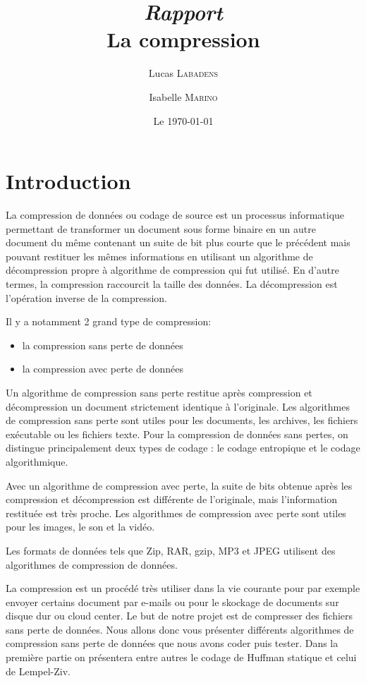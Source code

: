 \documentclass{report}
\title{\textit{Rapport} \\ La compression}
\author{Lucas \textsc{Labadens} \and Isabelle \textsc{Marino} }
\date{Le \today}
\begin{document}
\maketitle
 

\section*{Introduction}
La compression de données ou codage de source est un processus informatique permettant de transformer un document sous forme binaire en un autre document du même contenant un suite de bit plus courte que le précédent mais pouvant restituer les mêmes informations en utilisant un algorithme de décompression propre à algorithme de compression qui fut utilisé. En d'autre termes, la compression raccourcit la taille des données. La décompression est l'opération inverse de la compression.

Il y a notamment 2 grand type de compression:
\begin{itemize}
\item la compression sans perte de données
\item la compression avec perte de données
\end{itemize}

Un algorithme de compression sans perte restitue après compression et décompression un document strictement identique à l'originale. Les algorithmes de compression sans perte sont utiles pour les documents, les archives, les fichiers exécutable ou les fichiers texte.
Pour la compression de données sans pertes, on distingue principalement deux types de codage : le codage entropique et le codage algorithmique.

Avec un algorithme de compression avec perte, la suite de bits obtenue après les  compression et décompression est différente de l'originale, mais l'information restituée est très proche. Les algorithmes de compression avec perte sont utiles pour les images, le son et la vidéo.

Les formats de données tels que Zip, RAR, gzip, MP3 et JPEG utilisent des algorithmes de compression de données.

La compression est un procédé très utiliser dans la vie courante pour par exemple envoyer certains document par e-mails ou pour le skockage de documents sur disque dur ou cloud center.  
Le but de notre projet est de compresser des fichiers sans perte de données. 
Nous allons donc vous présenter différents algorithmes de compression sans perte de données que nous avons coder puis tester.
Dans la première partie on présentera entre autres le codage de Huffman statique et celui de Lempel-Ziv. 
\end{document}
